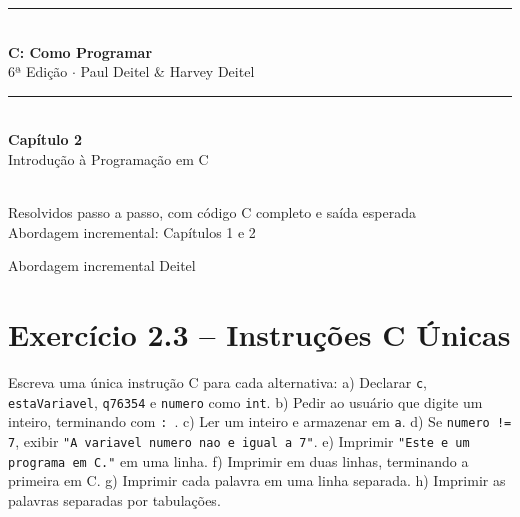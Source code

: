 \documentclass[12pt,a4paper]{article}
\begin{document}
\begin{titlepage}
  \centering\vspace*{2cm}
  {\color{deitelblue}\rule{\linewidth}{2pt}}\\[0.4cm]
  {\huge\bfseries\color{deitelblue}C: Como Programar}\\[0.2cm]
  {\large\color{deitelblue}6ª Edição $\cdot$ Paul Deitel \& Harvey Deitel}\\[0.2cm]
  {\color{deitelblue}\rule{\linewidth}{2pt}}\\[1cm]
  {\LARGE\bfseries Capítulo 2}\\[0.3cm]
  {\Large\color{deitelblue!80}Introdução à Programação em C}\\[0.8cm]
  \begin{tcolorbox}[colback=deitellightblue,colframe=deitelblue,width=0.85\linewidth]
    \\[0.2cm]
    {\normalsize Resolvidos passo a passo, com código C completo e saída esperada\\
    Abordagem incremental: Capítulos 1 e 2}
  \end{tcolorbox}
  \vfill{\small Abordagem incremental Deitel}
\end{titlepage}

\tableofcontents\newpage

\section{Exercício 2.3 -- Instruções C Únicas}
\begin{enunciadoBox}[Enunciado 2.3]
Escreva uma única instrução C para cada alternativa:
a) Declarar \texttt{c}, \texttt{estaVariavel}, \texttt{q76354} e \texttt{numero} como \texttt{int}.
b) Pedir ao usuário que digite um inteiro, terminando com \texttt{: }.
c) Ler um inteiro e armazenar em \texttt{a}.
d) Se \texttt{numero != 7}, exibir \texttt{"A variavel numero nao e igual a 7"}.
e) Imprimir \texttt{"Este e um programa em C."} em uma linha.
f) Imprimir em duas linhas, terminando a primeira em C.
g) Imprimir cada palavra em uma linha separada.
h) Imprimir as palavras separadas por tabulações.
\end{enunciadoBox}
\end{document}
